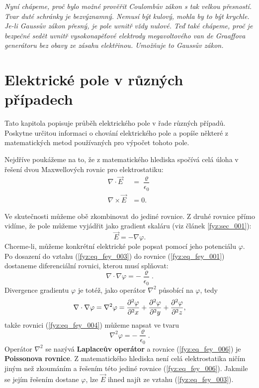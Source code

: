 {  \emph{Nyní chápeme, proč bylo možné prověřit Coulombův zákon s tak velkou přesností. Tvar 
  duté schránky je bezvýznamný. Nemusí být kulový, mohla by to být krychle. Je-li Gaussův zákon 
  přesný, je pole uvnitř vždy nulové. Teď také chápeme, proč je bezpečné sedět uvnitř 
  vysokonapěťové elektrody megavoltového van de Graaffova generátoru bez obavy ze zásahu 
  elektřinou. Umožňuje to Gaussův zákon.}

\section{Elektrické pole v různých případech}\label{fyz:IIchapVsecX}
  Tato kapitola popisuje průběh elektrického pole v řade různých případů. Poskytne určitou 
  informaci o chování elektrického pole a popíše některé z matematických metod používaných pro 
  výpočet tohoto pole.
  
  Nejdříve poukážeme na to, že z matematického hlediska spočívá celá úloha v řešení dvou 
  Maxwellových rovnic pro elektrostatiku:
  \begin{align}
    \nabla\cdot\vec{E}  &= \dfrac{\varrho}{\epsilon_0}  \label{fyz:eq_fey_001} \\
    \nabla\times\vec{E} &= 0.                           \label{fyz:eq_fey_002}
  \end{align}
  
  Ve skutečnosti můžeme obě zkombinovat do jediné rovnice. Z druhé rovnice přímo vidíme, že pole 
  můžeme vyjádřit jako gradient skaláru (viz článek \ref{fyz:sec_001}):
  \begin{equation}\label{fyz:eq_fey_003}
    \vec{E} = - \nabla\varphi.
  \end{equation}
  Chceme-li, můžeme konkrétní elektrické pole popsat pomocí jeho potenciálu \(\varphi\). Po 
  dosazení do vztahu (\ref{fyz:eq_fey_003}) do rovnice (\ref{fyz:eq_fey_001}) dostaneme 
  diferenciální rovnici, kterou musí splňovat:
  \begin{equation}\label{fyz:eq_fey_004}
  \nabla\cdot\nabla\varphi = - \dfrac{\varrho}{\epsilon_0}.
  \end{equation}
  Divergence gradientu \(\varphi\) je totéž, jako operátor \(\nabla^2\) působící na \(\varphi\), 
  tedy
  \begin{equation}\label{fyz:eq_fey_005}
  \nabla\cdot\nabla\varphi = \nabla^2\varphi 
    = \frac{\partial^2 \varphi}{\partial^2 x} + \frac{\partial^2 \varphi}{\partial^2 y} + \frac{\partial^2 \varphi}{\partial^2 z},
  \end{equation}
  takže rovnici (\ref{fyz:eq_fey_004}) můžeme napsat ve tvaru
  \begin{equation}\label{fyz:eq_fey_006}
  \nabla^2\varphi = - \dfrac{\varrho}{\epsilon_0}.
  \end{equation}
  Operátor \(\nabla^2\) se nazývá \textbf{Laplaceův operátor} a rovnice (\ref{fyz:eq_fey_006}) je 
  \textbf{Poissonova rovnice}. Z matematického hlediska není celá elektrostatika ničím jiným než 
  zkoumáním a řešením této jediné rovnice (\ref{fyz:eq_fey_006}). Jakmile se jejím řešením 
  dostane \(\varphi\), lze \(\vec{E}\) ihned najít ze vztahu (\ref{fyz:eq_fey_003}).
  
}
